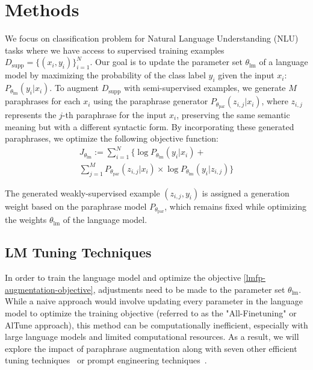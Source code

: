 \documentclass[11pt]{article}
\begin{document}
\section{Methods}
We focus on classification problem for Natural Language Understanding (NLU) tasks where we have access to supervised training examples $D_{\text{supp}} = \{(x_i, y_i)\}_{i=1}^{N}$. Our goal is to update the parameter set $\theta_{\text{lm}}$ of a language model by maximizing the probability of the class label $y_i$ given the input $x_i$: $P_{\theta_{\text{lm}}} (y_i | x_i)$. To augment $D_{\text{supp}}$ with semi-supervised examples, we generate $M$ paraphrases for each $x_i$ using the paraphrase generator $P_{\theta_{\text{par}}} (z_{i,j} | x_i)$, where $z_{i,j}$ represents the $j$-th paraphrase for the input $x_i$, preserving the same semantic meaning but with a different syntactic form. By incorporating these generated paraphrases, we optimize the following objective function:
\begin{multline}
J_{\theta_{\text{lm}}} := \sum_{i=1}^{N} \{\log P_{\theta_{\text{lm}}} (y_i | x_i) + \\
\sum_{j=1}^{M} P_{\theta_{\text{par}}} (z_{i,j} | x_i) \times \log P_{\theta_{\text{lm}}} (y_i | z_{i,j})\}
\label{lmfp-augmentation-objective}
\end{multline}

The generated weakly-supervised example $(z_{i,j}, y_i)$ is assigned a generation weight based on the paraphrase model $P_{\theta_{\text{par}}}$, which remains fixed while optimizing the weights $\theta_{\text{lm}}$ of the language model.

\subsection{LM Tuning Techniques}
In order to train the language model and optimize the objective \ref{lmfp-augmentation-objective}, adjustments need to be made to the parameter set $\theta_{\text{lm}}$. While a naive approach would involve updating every parameter in the language model to optimize the training objective (referred to as the "All-Finetuning" or AlTune approach), this method can be computationally inefficient, especially with large language models and limited computational resources. As a result, we will explore the impact of paraphrase augmentation along with seven other efficient tuning techniques~\cite{pmlr-v97-houlsby19a} or prompt engineering techniques~\cite{liu2021pretrain}.
\end{document}
